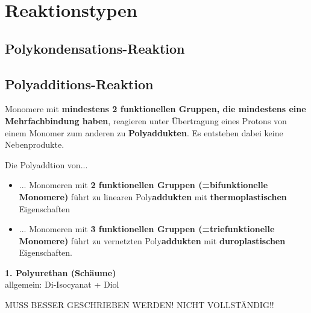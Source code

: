\section{Reaktionstypen}

\subsection{Polykondensations-Reaktion}

\subsection{Polyadditions-Reaktion}
Monomere mit 
\textbf{mindestens 2 funktionellen Gruppen, die mindestens eine Mehrfachbindung haben}, 
reagieren unter Übertragung eines Protons von einem Monomer zum anderen zu \textbf{Polyaddukten}. 
Es entstehen dabei keine Nebenprodukte.

Die Polyaddtion von... 
\begin{itemize}
    \item ... Monomeren mit \textbf{2 funktionellen Gruppen (=bifunktionelle Monomere)} führt zu linearen Poly\textbf{addukten} mit \textbf{thermoplastischen} Eigenschaften
    \item ... Monomeren mit \textbf{3 funktionellen Gruppen (=triefunktionelle Monomere)} führt zu vernetzten Poly\textbf{addukten} mit \textbf{duroplastischen} Eigenschaften.
\end{itemize}

\vspace{0.4cm}

\textbf{1. Polyurethan (Schäume)} \\
allgemein: Di-Isocyanat + Diol

MUSS BESSER GESCHRIEBEN WERDEN! NICHT VOLLSTÄNDIG!!



